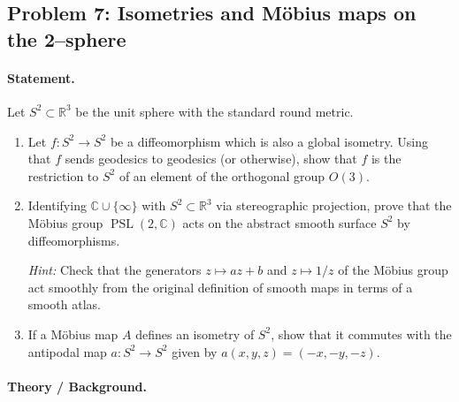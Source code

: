 \documentclass[12pt,a4paper]{article}
\theoremstyle{plain}
\theoremstyle{definition}      %
\begin{document}
	\subsection*{Problem 7: Isometries and Möbius maps on the 2--sphere}
	
	\paragraph{Statement.}
	Let $S^{2}\subset\mathbb{R}^{3}$ be the unit sphere with the standard round metric.
	
	\begin{enumerate}
		\item Let $f:S^{2}\to S^{2}$ be a diffeomorphism which is also a global isometry.
		Using that $f$ sends geodesics to geodesics (or otherwise), show that
		$f$ is the restriction to $S^{2}$ of an element of the orthogonal group $O(3)$.
		\item Identifying $\mathbb{C}\cup\{\infty\}$ with $S^{2}\subset\mathbb{R}^{3}$ via stereographic projection,
		prove that the M\"obius group $\operatorname{PSL}(2,\mathbb{C})$ acts on the abstract smooth surface $S^{2}$ by diffeomorphisms.
		
		\emph{Hint:} Check that the generators $z\mapsto az+b$ and $z\mapsto 1/z$ of the M\"obius group
		act smoothly from the original definition of smooth maps in terms of a smooth atlas.
		\item If a M\"obius map $A$ defines an isometry of $S^{2}$, show that it commutes with the antipodal map
		$a:S^{2}\to S^{2}$ given by $a(x,y,z)=(-x,-y,-z)$.
	\end{enumerate}
	
	\paragraph{Theory / Background.}
	
\end{document}
